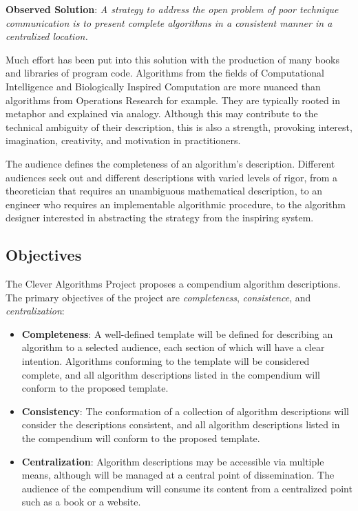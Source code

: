 \documentclass[a4paper, 11pt]{article}
\begin{document}
\textbf{Observed Solution}: \emph{A strategy to address the open problem of poor technique communication is to present complete algorithms in a consistent manner in a centralized location.} 

Much effort has been put into this solution with the production of many books and libraries of program code. Algorithms from the fields of Computational Intelligence and Biologically Inspired Computation are more nuanced than algorithms from Operations Research for example. They are typically rooted in metaphor and explained via analogy. Although this may contribute to the technical ambiguity of their description, this is also a strength, provoking interest, imagination, creativity, and motivation in practitioners. 

The audience defines the completeness of an algorithm's description. Different audiences seek out and different descriptions with varied levels of rigor, from a theoretician that requires an unambiguous mathematical description, to an engineer who requires an implementable algorithmic procedure, to the algorithm designer interested in abstracting the strategy from the inspiring system. 

\subsection{Objectives}

The Clever Algorithms Project proposes a compendium algorithm descriptions. The primary objectives of the project are \emph{completeness}, \emph{consistence}, and \emph{centralization}:

\begin{itemize}
	\item \textbf{Completeness}: A well-defined template will be defined for describing an algorithm to a selected audience, each section of which will have a clear intention. Algorithms conforming to the template will be considered complete, and all algorithm descriptions listed in the compendium will conform to the proposed template.
	\item \textbf{Consistency}: The conformation of a collection of algorithm descriptions will consider the descriptions consistent, and all algorithm descriptions listed in the compendium will conform to the proposed template.
	\item \textbf{Centralization}: Algorithm descriptions may be accessible via multiple means, although will be managed at a central point of dissemination. The audience of the compendium will consume its content from a centralized point such as a book or a website.
\end{itemize}
\end{document}
